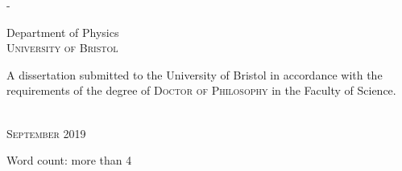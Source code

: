 \begin{titlingpage}
\begin{SingleSpace}
\begin{adjustwidth*}{\unitlength}{-\unitlength}
\begin{center}
\vspace{30mm}
{\large Department of Physics\\
\textsc{University of Bristol}}\\
\vspace{15mm}
\begin{minipage}{9cm}
A dissertation submitted to the University of Bristol in accordance with the requirements of the degree of \textsc{Doctor of Philosophy} in the Faculty of Science.
\end{minipage}\\
\vspace{9mm}
{\large\textsc{September 2019}}
\vspace{12mm}
\end{center}
\begin{flushright}
{\small Word count: more than 4}
\end{flushright}
\end{adjustwidth*}
\end{SingleSpace}
\end{titlingpage}